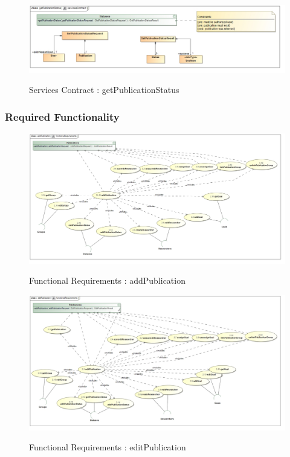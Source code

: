 \documentclass{article}
\begin{document}
		\begin{figure}[H]
		\includegraphics[width=\textwidth]{Quinton_Diagrams/class__getPublicationStatus__servicesContract.jpg}  \\
		\caption{Services Contract : getPublicationStatus}
		\end{figure}
		

	\subsubsection{Required Functionality}
		\begin{figure}[H]
		\includegraphics[width=\textwidth]{Quinton_Diagrams/class__addPublication__functionalRequirements.jpg}  \\
		\caption{Functional Requirements : addPublication}
		\end{figure}
		
		\begin{figure}[H]
		\includegraphics[width=\textwidth]{Quinton_Diagrams/class__editPublication__functionalRequirements.jpg}  \\
		\caption{Functional Requirements : editPublication}
		\end{figure}
		
\end{document}
